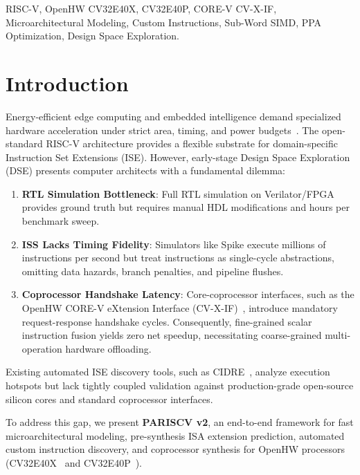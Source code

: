 \documentclass[conference]{IEEEtran}
\begin{document}
\begin{IEEEkeywords}
RISC-V, OpenHW CV32E40X, CV32E40P, CORE-V CV-X-IF, Microarchitectural Modeling, Custom Instructions, Sub-Word SIMD, PPA Optimization, Design Space Exploration.
\end{IEEEkeywords}

\section{Introduction}

Energy-efficient edge computing and embedded intelligence demand specialized hardware acceleration under strict area, timing, and power budgets~\cite{embench, cidre2025}. The open-standard RISC-V architecture provides a flexible substrate for domain-specific Instruction Set Extensions (ISE). However, early-stage Design Space Exploration (DSE) presents computer architects with a fundamental dilemma:
\begin{enumerate}
    \item \textbf{RTL Simulation Bottleneck}: Full RTL simulation on Verilator/FPGA provides ground truth but requires manual HDL modifications and hours per benchmark sweep.
    \item \textbf{ISS Lacks Timing Fidelity}: Simulators like Spike execute millions of instructions per second but treat instructions as single-cycle abstractions, omitting data hazards, branch penalties, and pipeline flushes.
    \item \textbf{Coprocessor Handshake Latency}: Core-coprocessor interfaces, such as the OpenHW CORE-V eXtension Interface (CV-X-IF)~\cite{openhw_xif}, introduce mandatory request-response handshake cycles. Consequently, fine-grained scalar instruction fusion yields zero net speedup, necessitating coarse-grained multi-operation hardware offloading.
\end{enumerate}

Existing automated ISE discovery tools, such as CIDRE~\cite{cidre2025}, analyze execution hotspots but lack tightly coupled validation against production-grade open-source silicon cores and standard coprocessor interfaces.

To address this gap, we present \textbf{PARISCV v2}, an end-to-end framework for fast microarchitectural modeling, pre-synthesis ISA extension prediction, automated custom instruction discovery, and coprocessor synthesis for OpenHW processors (CV32E40X~\cite{openhw_cv32e40x} and CV32E40P~\cite{openhw_cv32e40p}). 
\end{document}
